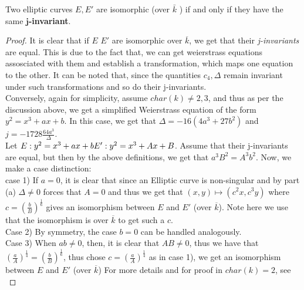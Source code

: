  \begin{proposition}
     Two elliptic curves $E, E'$ are isomorphic (over $\bar{k}$ ) if and only if they have the same $\bm{j}$\textbf{-invariant}.
\begin{proof}
 It is clear that if $E$  $E'$ are isomorphic over $\overline{k}$, we get that their \textit{j-invariants} are equal. This is due to the fact that, we can get weierstrass equations assosciated with them and establish a transformation, which maps one equation to the other. It can be noted that, since the quantities $c_4, \Delta$ remain invariant under such transformations and so do their j-invariants. \\
 
 Conversely, again for simplicity, assume $char(k)\neq 2,3$, and thus as per the discussion above, we get a simplified Weierstrass equation of the form $y^2=x^3+ax+b$. \newline
 In this case, we get that $\Delta=-16(4a^3+27b^2)$ and $j=-1728 \frac{64a^3}{\Delta}$. \\
 Let $E: y^2=x^3+ax+b \newline E': y^2=x^3+Ax+B$.
 Assume that their j-invariants are equal, but then by the above definitions, we get that $a^3B^2=A^3b^2$. 
 Now, we make a case distinction: \\
case 1) If $a=0$, it is clear that since an Elliptic curve is non-singular and by part (a) $\Delta \neq 0 $ forces that $A=0$ and thus we get that $(x,y)  \mapsto (c^2x,c^3y)$ where $c=(\frac{b}{B})^\frac{1}{6}$ gives an isomorphism between $E$ and $E'$ (over $\overline{k}$). Note here we use that the isomorphism is over $\overline{k}$ to get such a $c$. \\
Case 2) By symmetry, the case $b=0$ can be handled analogously. \\
Case 3) When $ab \neq 0$, then, it is clear that $AB \neq 0$, thus we have that $(\frac{a}{A})^\frac{1}{4}=(\frac{b}{B})^\frac{1}{6}$, thus chose $c=(\frac{a}{A})^\frac{1}{4}$ as in case 1), we get an isomorphism between $E$ and $E'$ (over $\overline{k}$) \newline
For more details and for proof in $char(k)=2$, see \cite{silv}   
\end{proof}
 \end{proposition}\newline

